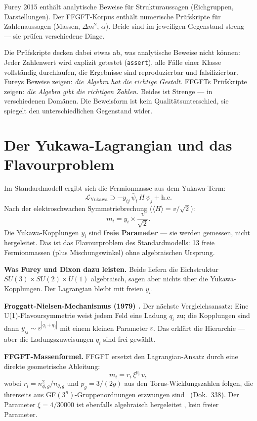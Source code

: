 Furey 2015 enthält analytische Beweise für Strukturaussagen
(Eichgruppen, Darstellungen). Der FFGFT-Korpus enthält numerische Prüfskripte
für Zahlenaussagen (Massen, $\Delta m^2$, $\alpha$). Beide sind im jeweiligen
Gegenstand streng --- sie prüfen verschiedene Dinge.

Die Prüfskripte decken dabei etwas ab, was analytische Beweise nicht können:
Jeder Zahlenwert wird explizit getestet (\texttt{assert}), alle Fälle
einer Klasse vollständig durchlaufen, die Ergebnisse sind reproduzierbar
und falsifizierbar. Fureys Beweise zeigen: \emph{die Algebra hat die richtige
Gestalt.} FFGFTs Prüfskripte zeigen: \emph{die Algebra gibt die richtigen
Zahlen.} Beides ist Strenge --- in verschiedenen Domänen. Die Beweisform
ist kein Qualitätsunterschied, sie spiegelt den unterschiedlichen
Gegenstand wider.


\section{Der Yukawa-Lagrangian und das Flavourproblem}

Im Standardmodell ergibt sich die Fermionmasse aus dem Yukawa-Term:
\[
\mathcal{L}_\text{Yukawa} \supset -y_{ij}\,\bar\psi_i\,H\,\psi_j + \mathrm{h.c.}
\]
Nach der elektroschwachen Symmetriebrechung ($\langle H\rangle = v/\sqrt{2}$):
\[
m_i = y_i \times \frac{v}{\sqrt{2}}.
\]
Die Yukawa-Kopplungen $y_i$ sind \textbf{freie Parameter} --- sie werden gemessen,
nicht hergeleitet. Das ist das Flavourproblem des Standardmodells:
13 freie Fermionmassen (plus Mischungswinkel) ohne algebraischen Ursprung.

\textbf{Was Furey und Dixon dazu leisten.} Beide liefern die Eichstruktur
$SU(3)\times SU(2)\times U(1)$ algebraisch, sagen aber nichts über die
Yukawa-Kopplungen. Der Lagrangian bleibt mit freien $y_i$.

\textbf{Froggatt-Nielsen-Mechanismus (1979) \cite{FroggattNielsen1979}.}
Der nächste Vergleichsansatz: Eine U(1)-Flavoursymmetrie weist jedem Feld
eine Ladung $q_i$ zu; die Kopplungen sind dann $y_{ij}\sim\varepsilon^{|q_i+q_j|}$
mit einem kleinen Parameter $\varepsilon$. Das erklärt die Hierarchie ---
aber die Ladungszuweisungen $q_i$ sind frei gewählt.

\textbf{FFGFT-Massenformel.}
FFGFT ersetzt den Lagrangian-Ansatz durch eine direkte geometrische Ableitung:
\[
m_i = r_i\,\xi^{p_i}\,v,
\]
wobei $r_i = n_{\phi,g}^2/n_{\theta,g}$ und $p_g = 3/(2g)$ aus den
Torus-Wicklungszahlen folgen, die ihrerseits aus GF$(3^n)$-Gruppenordnungen
erzwungen sind \KM\ (Dok.~338). Der Parameter $\xi = 4/30000$ ist ebenfalls
algebraisch hergeleitet \KM, kein freier Parameter.

